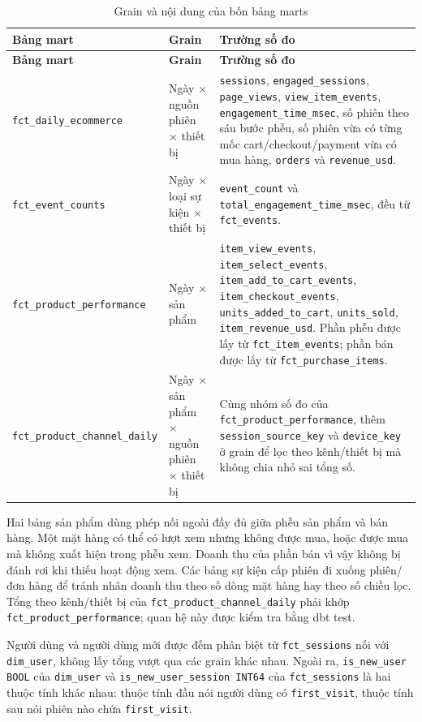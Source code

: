 \begin{xltabular}{\textwidth}{>{\raggedright\arraybackslash}p{4.7cm} >{\raggedright\arraybackslash}p{4.2cm} >{\raggedright\arraybackslash}X}
\caption{Grain và nội dung của bốn bảng marts}
\label{tab:marts-detail} \\
\hline
\textbf{Bảng mart} & \textbf{Grain} & \textbf{Trường số đo} \\
\hline
\endfirsthead
\hline
\textbf{Bảng mart} & \textbf{Grain} & \textbf{Trường số đo} \\
\hline
\endhead
\hline
\endfoot
\hline
\endlastfoot

\texttt{fct\_daily\_ecommerce}
& Ngày $\times$ nguồn phiên $\times$ thiết bị
& \texttt{sessions}, \texttt{engaged\_sessions}, \texttt{page\_views}, \texttt{view\_item\_events}, \texttt{engagement\_time\_msec}, số phiên theo sáu bước phễu, số phiên vừa có từng mốc cart/checkout/payment vừa có mua hàng, \texttt{orders} và \texttt{revenue\_usd}. \\

\texttt{fct\_event\_counts}
& Ngày $\times$ loại sự kiện $\times$ thiết bị
& \texttt{event\_count} và \texttt{total\_engagement\_time\_msec}, đều từ \texttt{fct\_events}. \\

\texttt{fct\_product\_performance}
& Ngày $\times$ sản phẩm
& \texttt{item\_view\_events}, \texttt{item\_select\_events}, \texttt{item\_add\_to\_cart\_events}, \texttt{item\_checkout\_events}, \texttt{units\_added\_to\_cart}, \texttt{units\_sold}, \texttt{item\_revenue\_usd}. Phần phễu được lấy từ \texttt{fct\_item\_events}; phần bán được lấy từ \texttt{fct\_purchase\_items}. \\

\texttt{fct\_product\_channel\_daily}
& Ngày $\times$ sản phẩm $\times$ nguồn phiên $\times$ thiết bị
& Cùng nhóm số đo của \texttt{fct\_product\_performance}, thêm \texttt{session\_source\_key} và \texttt{device\_key} ở grain để lọc theo kênh/thiết bị mà không chia nhỏ sai tổng số. \\
\end{xltabular}

Hai bảng sản phẩm dùng phép nối ngoài đầy đủ giữa phễu sản phẩm và bán hàng. Một mặt hàng có thể có lượt xem nhưng không được mua, hoặc được mua mà không xuất hiện trong phễu xem. Doanh thu của phần bán vì vậy không bị đánh rơi khi thiếu hoạt động xem. Các bảng sự kiện cấp phiên đi xuống phiên/đơn hàng để tránh nhân doanh thu theo số dòng mặt hàng hay theo số chiều lọc. Tổng theo kênh/thiết bị của \texttt{fct\_product\_channel\_daily} phải khớp \texttt{fct\_product\_performance}; quan hệ này được kiểm tra bằng dbt test. \medskip

Người dùng và người dùng mới được đếm phân biệt từ \texttt{fct\_sessions} nối với \texttt{dim\_user}, không lấy tổng vượt qua các grain khác nhau. Ngoài ra, \texttt{is\_new\_user BOOL} của \texttt{dim\_user} và \texttt{is\_new\_user\_session INT64} của \texttt{fct\_sessions} là hai thuộc tính khác nhau: thuộc tính đầu nói người dùng có \texttt{first\_visit}, thuộc tính sau nói phiên nào chứa \texttt{first\_visit}.
